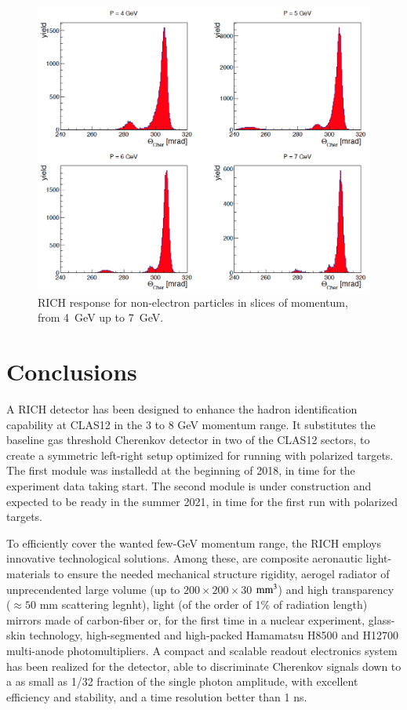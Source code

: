 \documentclass[5p,times,twocolumn]{elsarticle}
\begin{document}
\begin{figure}[t]
\begin{center}
\includegraphics[width=1.0\columnwidth]{Pslices.png}
\end{center}
\caption{RICH response for non-electron particles in slices of momentum, from 4~GeV up to 7~GeV.}
\label{Fig:CHhad2}
\end{figure}

\section{Conclusions}

A RICH detector has been designed to enhance the hadron identification capability 
at CLAS12 in the 3 to 8 GeV momentum range. It substitutes the baseline gas threshold Cherenkov detector 
in two of the CLAS12 sectors, to create a symmetric left-right setup 
optimized for running with polarized targets. The first module was
installedd at the beginning of 2018, in time for the experiment data 
taking start. The second module is under construction and expected to be ready in 
the summer 2021, in time for the first run with polarized targets.

To efficiently cover the wanted few-GeV momentum range, the RICH employs 
innovative technological solutions. Among these, are composite 
aeronautic light-materials to ensure the needed mechanical structure rigidity, 
aerogel radiator of unprecendented large volume (up to $200 \times 200 \times 30$ $\rm mm^3$) 
and high transparency ($\approx 50$ mm scattering legnht), light 
(of the order of 1\% of radiation length) mirrors made of carbon-fiber or, for
the first time in a nuclear experiment, glass-skin technology,
high-segmented and high-packed Hamamatsu H8500 and H12700 multi-anode photomultipliers.
A compact and scalable readout electronics system has been realized for 
the detector, able to discriminate Cherenkov signals down to a as small as 1/32 fraction
of the single photon amplitude, with excellent efficiency and stability,
and a time resolution better than 1 ns.
\end{document}
